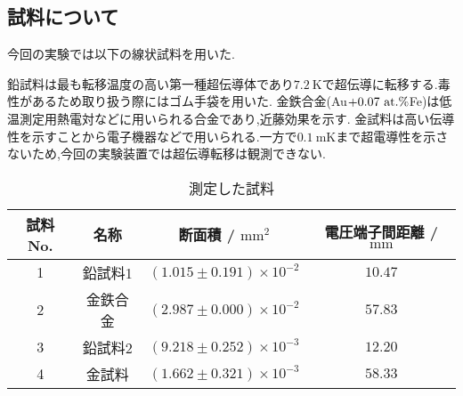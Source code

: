\subsection{試料について}
今回の実験では以下の線状試料を用いた.

鉛試料は最も転移温度の高い第一種超伝導体であり$7.2\ \si{\kelvin}$で超伝導に転移する.毒性があるため取り扱う際にはゴム手袋を用いた.
金鉄合金(Au$+0.07\ {\rm at}.\%$Fe)は低温測定用熱電対などに用いられる合金であり,近藤効果を示す.
金試料は高い伝導性を示すことから電子機器などで用いられる.一方で$0.1\ \si{\milli\kelvin}$まで超電導性を示さないため,今回の実験装置では超伝導転移は観測できない.
\begin{table}[h]
\caption{測定した試料}
\label{tab:siryou}
\centering
\begin{tabular}{cccc}
\hline
試料No.&名称&断面積 / $\si{\milli\metre^2}$&電圧端子間距離 / $\si{\milli\metre}$\\
\hline \hline
1&鉛試料1&$(1.015\pm0.191)\times10^{-2}$&$10.47$\\
2&金鉄合金&$(2.987\pm0.000)\times10^{-2}$&$57.83$\\
3&鉛試料2&$(9.218\pm0.252)\times10^{-3}$&$12.20$\\
4&金試料&$(1.662\pm0.321)\times10^{-3}$&$58.33$\\
\hline
\end{tabular}
\end{table}